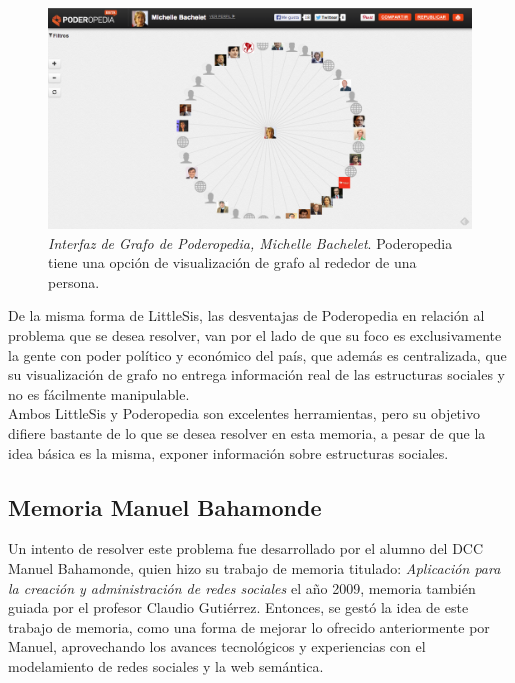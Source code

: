 \begin{figure}[H]
  \includegraphics[width=1.0\textwidth]{images/grafo_poderopedia.png}
  \caption[Interfaz de Grafo de Poderopedia, Michelle Bachelet]{\emph{Interfaz de Grafo de Poderopedia, Michelle Bachelet}. Poderopedia tiene una opción de visualización de grafo al rededor de una persona.}
  \label{ejemplo_grafo_poderopedia}
\end{figure}

De la misma forma de LittleSis, las desventajas de Poderopedia en relación al problema que se desea resolver, van por el lado de que su foco es exclusivamente la gente con poder político y económico del país, que además es centralizada, que su visualización de grafo no entrega información real de las estructuras sociales y no es fácilmente manipulable.\\

Ambos LittleSis y Poderopedia son excelentes herramientas, pero su objetivo difiere bastante de lo que se desea resolver en esta memoria, a pesar de que la idea básica es la misma, exponer información sobre estructuras sociales.


\subsection{Memoria Manuel Bahamonde} %
\label{sub:memoria_manuel_bahamonde}

Un intento de resolver este problema fue desarrollado por el alumno del DCC Manuel Bahamonde, quien hizo su trabajo de memoria titulado: \emph{Aplicación para la creación y administración de redes sociales} \cite{memoriamanuel} el año 2009, memoria también guiada por el profesor Claudio Gutiérrez. Entonces, se gestó la idea de este trabajo de memoria, como una forma de mejorar lo ofrecido anteriormente por Manuel, aprovechando los avances tecnológicos y experiencias con el modelamiento de redes sociales y la web semántica.\\

